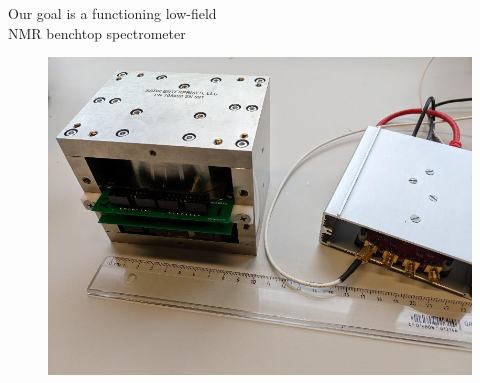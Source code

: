 \documentclass{ethpresentation}
\begin{document}
  \maketitle
  \begin{frame}{Our goal is a functioning low-field\\NMR benchtop spectrometer}
    \begin{figure}
      \centering
      \includegraphics[width=\textwidth,height=0.8\textheight,keepaspectratio]{./img/magnet.png}
    \end{figure}
  \end{frame}
\end{document}

